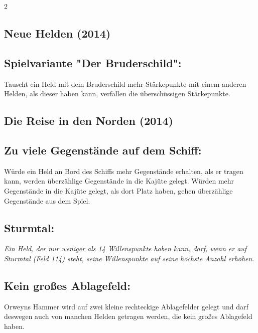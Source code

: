 \documentclass[10pt, a4paper, oneside]{book}
\newcommand{\fan}[1]{\textit{#1}}
\begin{document}
\begin{multicols*}{2}
\begin{nobgcolor}
\section{Neue Helden (2014)}

\subsection{Spielvariante "Der Bruderschild":}

Tauscht ein Held mit dem Bruderschild mehr Stärkepunkte mit einem anderen Helden, als dieser haben kann, verfallen die überschüssigen Stärkepunkte.
\supercite{NH:Begleitheft}

\end{nobgcolor}


\begin{bgcolor}
\section{Die Reise in den Norden (2014)}

\subsection{Zu viele Gegenstände auf dem Schiff:}

Würde ein Held an Bord des Schiffs mehr Gegenstände erhalten, als er tragen kann, werden überzählige Gegenstände in die Kajüte gelegt. Würden mehr Gegenstände in die Kajüte gelegt, als dort Platz haben, gehen überzählige Gegenstände aus dem Spiel.
\supercite{11056}


\subsection{Sturmtal:}

\fan{Ein Held, der nur weniger als 14 Willenspunkte haben kann, darf, wenn er auf Sturmtal (Feld 114) steht, seine Willenspunkte auf seine höchste Anzahl erhöhen.}





\subsection{Kein großes Ablagefeld:}

Orweyns Hammer wird auf zwei kleine rechteckige Ablagefelder gelegt und darf deswegen auch von manchen Helden getragen werden, die kein großes Ablagefeld haben.
\supercite{DRidN:Begleitheft}


\end{bgcolor}
\end{multicols*}
\end{document}
